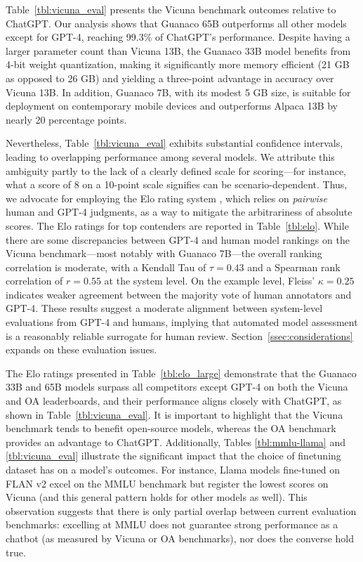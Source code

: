 Table~\ref{tbl:vicuna_eval} presents the Vicuna benchmark \cite{vicuna2023} outcomes relative to ChatGPT. Our analysis shows that {Guanaco} 65B outperforms all other models except for GPT-4, reaching 99.3\% of ChatGPT's performance. Despite having a larger parameter count than Vicuna 13B, the {Guanaco} 33B model benefits from 4-bit weight quantization, making it significantly more memory efficient (21 GB as opposed to 26 GB) and yielding a three-point advantage in accuracy over Vicuna 13B. In addition, {Guanaco} 7B, with its modest 5 GB size, is suitable for deployment on contemporary mobile devices and outperforms Alpaca 13B by nearly 20 percentage points.

Nevertheless, Table~\ref{tbl:vicuna_eval} exhibits substantial confidence intervals, leading to overlapping performance among several models. We attribute this ambiguity partly to the lack of a clearly defined scale for scoring—for instance, what a score of 8 on a 10-point scale signifies can be scenario-dependent. Thus, we advocate for employing the Elo rating system \citep{elo1967proposed}, which relies on \textit{pairwise} human and GPT-4 judgments, as a way to mitigate the arbitrariness of absolute scores. The Elo ratings for top contenders are reported in Table~\ref{tbl:elo}. While there are some discrepancies between GPT-4 and human model rankings on the Vicuna benchmark—most notably with Guanaco 7B—the overall ranking correlation is moderate, with a Kendall Tau of $\tau=0.43$ and a Spearman rank correlation of $r=0.55$ at the system level. On the example level, Fleiss’ $\kappa=0.25$ indicates weaker agreement between the majority vote of human annotators and GPT-4. These results suggest a moderate alignment between system-level evaluations from GPT-4 and humans, implying that automated model assessment is a reasonably reliable surrogate for human review. Section~\ref{ssec:considerations} expands on these evaluation issues.

The Elo ratings presented in Table~\ref{tbl:elo_large} demonstrate that the {Guanaco} 33B and 65B models surpass all competitors except GPT-4 on both the Vicuna and OA leaderboards, and their performance aligns closely with ChatGPT, as shown in Table~\ref{tbl:vicuna_eval}. It is important to highlight that the Vicuna benchmark tends to benefit open-source models, whereas the OA benchmark provides an advantage to ChatGPT. Additionally, Tables \ref{tbl:mmlu-llama} and \ref{tbl:vicuna_eval} illustrate the significant impact that the choice of finetuning dataset has on a model’s outcomes. For instance, Llama models fine-tuned on FLAN v2 excel on the MMLU benchmark but register the lowest scores on Vicuna (and this general pattern holds for other models as well). This observation suggests that there is only partial overlap between current evaluation benchmarks: excelling at MMLU does not guarantee strong performance as a chatbot (as measured by Vicuna or OA benchmarks), nor does the converse hold true.

